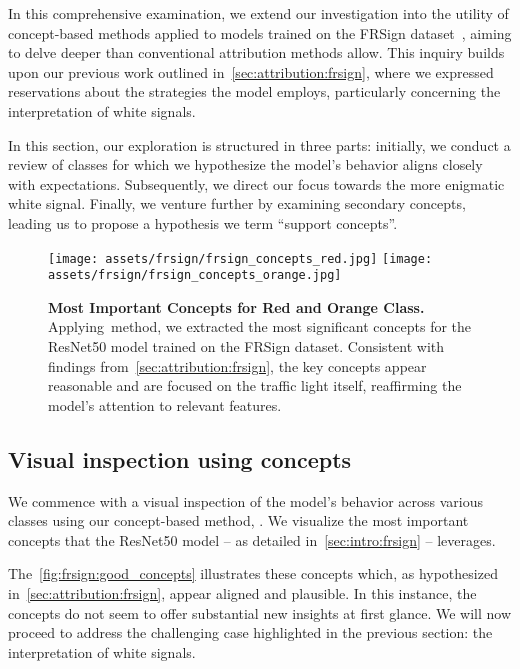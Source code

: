 In this comprehensive examination, we extend our investigation into the utility of concept-based methods applied to models trained on the FRSign dataset~\cite{2020frsign}, aiming to delve deeper than conventional attribution methods allow. This inquiry builds upon our previous work outlined in~\autoref{sec:attribution:frsign}, where we expressed reservations about the strategies the model employs, particularly concerning the interpretation of white signals.

In this section, our exploration is structured in three parts: initially, we conduct a review of classes for which we hypothesize the model's behavior aligns closely with expectations. Subsequently, we direct our focus towards the more enigmatic white signal. Finally, we venture further by examining secondary concepts, leading us to propose a hypothesis we term ``support concepts''.

\begin{figure}[ht]
\centering
\texttt{[image: assets/frsign/frsign\_concepts\_red.jpg]}
\texttt{[image: assets/frsign/frsign\_concepts\_orange.jpg]}
\caption{\textbf{Most Important Concepts for Red and Orange Class.} Applying~\craft method, we extracted the most significant concepts for the ResNet50 model trained on the FRSign dataset. Consistent with findings from~\autoref{sec:attribution:frsign}, the key concepts appear reasonable and are focused on the traffic light itself, reaffirming the model's attention to relevant features.}
\label{fig:frsign:good_concepts}
\end{figure}


\subsection{Visual inspection using concepts}

We commence with a visual inspection of the model's behavior across various classes using our concept-based method, \craft. We visualize the most important concepts that the ResNet50 model -- as detailed in~\autoref{sec:intro:frsign} --  leverages. 

The~\autoref{fig:frsign:good_concepts} illustrates these concepts which, as hypothesized in~\autoref{sec:attribution:frsign}, appear aligned and plausible. In this instance, the concepts do not seem to offer substantial new insights at first glance. We will now proceed to address the challenging case highlighted in the previous section: the interpretation of white signals.

